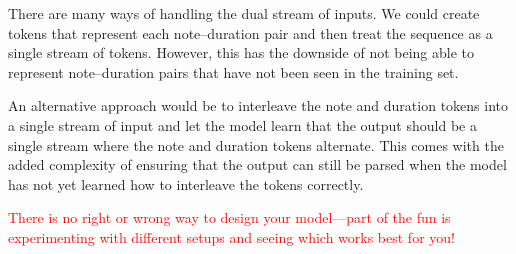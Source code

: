 There are many ways of handling the dual stream of inputs.
We could create tokens that represent each note–duration pair and then treat the sequence as a single stream of tokens.
However, this has the downside of not being able to represent note–duration pairs that have not been seen in the training set.

An alternative approach would be to interleave the note and duration tokens into a single stream of input and let the model learn that the output should be a single stream where the note and duration tokens alternate.
This comes with the added complexity of ensuring that the output can still be parsed when the model has not yet learned how to interleave the tokens correctly.

\textcolor{red}{There is no right or wrong way to design your model—part of the fun is experimenting with different setups and seeing which works best for you!}


